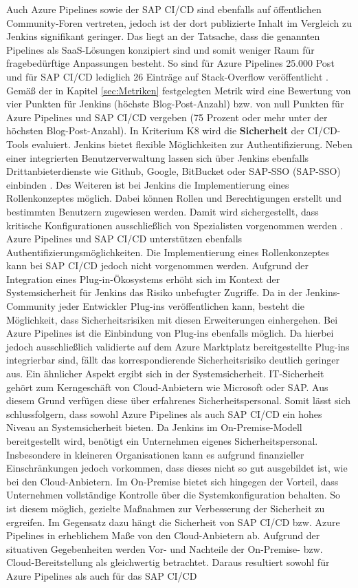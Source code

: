 Auch Azure Pipelines sowie der SAP CI/CD sind ebenfalls auf öffentlichen Community-Foren vertreten, jedoch ist der dort publizierte Inhalt im Vergleich zu Jenkins signifikant geringer. Das liegt an der Tatsache, dass die genannten Pipelines als SaaS-Lösungen konzipiert sind und somit weniger Raum für fragebedürftige Anpassungen besteht. So sind für Azure Pipelines 25.000 Post und für SAP CI/CD lediglich 26 Einträge auf Stack-Overflow veröffentlicht \cite{StackOverflow.20230403b}\cite{StackOverflow.20230403c}. Gemäß der in Kapitel \ref{sec:Metriken} festgelegten Metrik wird eine Bewertung von vier Punkten für Jenkins (höchste Blog-Post-Anzahl) bzw. von null Punkten für Azure Pipelines und SAP CI/CD vergeben (75 Prozent oder mehr unter der höchsten Blog-Post-Anzahl). In Kriterium K8 wird die \textbf{Sicherheit} der CI/CD-Tools evaluiert. Jenkins bietet flexible Möglichkeiten zur Authentifizierung. Neben einer integrierten Benutzerverwaltung lassen sich über Jenkins ebenfalls Drittanbieterdienste wie Github, Google, BitBucket oder SAP-\acl{SSO} (SAP-\acs{SSO}) einbinden \cite{.20230410f}\cite{.20230417b}\cite{.20230417c}. Des Weiteren ist bei Jenkins die Implementierung eines Rollenkonzeptes möglich. Dabei können Rollen und Berechtigungen erstellt und bestimmten Benutzern zugewiesen werden. Damit wird sichergestellt, dass kritische Konfigurationen ausschließlich von Spezialisten vorgenommen werden \cite{.20230410g}. Azure Pipelines und SAP CI/CD unterstützen ebenfalls Authentifizierungsmöglichkeiten. Die Implementierung eines Rollenkonzeptes kann bei SAP CI/CD jedoch nicht vorgenommen werden. Aufgrund der Integration eines Plug-in-Ökosystems erhöht sich im Kontext der Systemsicherheit für Jenkins das Risiko unbefugter Zugriffe. Da in der Jenkins-Community jeder Entwickler Plug-ins veröffentlichen kann, besteht die Möglichkeit, dass Sicherheitsrisiken mit diesen Erweiterungen einhergehen. Bei Azure Pipelines ist die Einbindung von Plug-ins ebenfalls möglich. Da hierbei jedoch ausschließlich validierte auf dem Azure Marktplatz bereitgestellte Plug-ins integrierbar sind, fällt das korrespondierende Sicherheitsrisiko deutlich geringer aus. Ein ähnlicher Aspekt ergibt sich in der Systemsicherheit. IT-Sicherheit gehört zum Kerngeschäft von Cloud-Anbietern wie Microsoft oder SAP. Aus diesem Grund verfügen diese über erfahrenes Sicherheitspersonal. Somit lässt sich schlussfolgern, dass sowohl Azure Pipelines als auch SAP CI/CD ein hohes Niveau an Systemsicherheit bieten. Da Jenkins im On-Premise-Modell bereitgestellt wird, benötigt ein Unternehmen eigenes Sicherheitspersonal. Insbesondere in kleineren Organisationen kann es aufgrund finanzieller Einschränkungen jedoch vorkommen, dass dieses nicht so gut ausgebildet ist, wie bei den Cloud-Anbietern. Im On-Premise bietet sich hingegen der Vorteil, dass Unternehmen vollständige Kontrolle über die Systemkonfiguration behalten. So ist diesem möglich, gezielte Maßnahmen zur Verbesserung der Sicherheit zu ergreifen. Im Gegensatz dazu hängt die Sicherheit von SAP CI/CD bzw. Azure Pipelines in erheblichem Maße von den Cloud-Anbietern ab. Aufgrund der situativen Gegebenheiten werden Vor- und Nachteile der On-Premise- bzw. Cloud-Bereitstellung als gleichwertig betrachtet. Daraus resultiert sowohl für Azure Pipelines als auch für das SAP CI/CD 